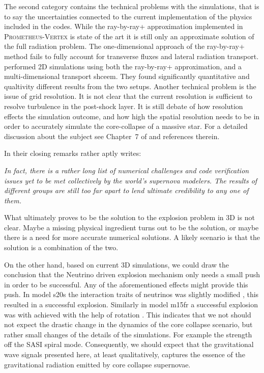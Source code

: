 The second category contains the technical problems with the simulations, 
that is to say the uncertainties connected to the current implementation of the physics included in the codes. 
While the ray-by-ray+ approximation implemented in \textsc{Prometheus-Vertex} \citep{rampp_02} is state of the art it is still only an approximate
solution of the full radiation problem. The one-dimensional approach of the ray-by-ray+ method fails to fully account for
transverse fluxes and lateral radiation transport. \cite{skinner_16} performed 2D simulations using both the ray-by-ray+ approximation,
and a multi-dimensional transport shceem. They found significantly quantitative and qualtivity different results from the two setups.
Another technical problem is the issue of grid resolution. It is not clear that the current resolution is 
sufficient to resolve turbulence in the post-shock layer. It is still debate of how resolution effects the simulation outcome, and
how high the spatial resolution needs to be in order to accurately simulate the core-collapse of a massive star. For a detailed discussion
about the subject see Chapter~7 of \cite{melson_phd} and references therein. 

In their closing remarks \cite{skinner_16} rather aptly writes:
\begin{displayquote}
\textit{In fact, there is a rather long list of numerical
challenges and code verification issues yet to be met
collectively by the world’s supernova modelers. The results
of different groups are still too far apart to lend ultimate
credibility to any one of them.} 
\end{displayquote}
What ultimately proves to be the solution to the explosion problem in 3D is not clear. Maybe a
missing physical ingredient turns out to be the solution, or maybe there is a need for
more accurate numerical solutions. A likely scenario is that the solution is
a combination of the two. 

On the other hand, based on current 3D simulations, we could draw the conclusion that the Neutrino driven explosion 
mechanism only needs a small push in order to be successful. Any of the aforementioned effects might provide this push. 
In model s20s the interaction traits of neutrinos was slightly modified \citep{melson_15b}, this resulted in a successful explosion. 
Similarly in model m15fr a successful explosion was with achieved with the help of rotation \citep{suma_models}. 
This indicates that we not should not expect the drastic change in the dynamics of the core collapse scenario, 
but rather small changes of the details of the simulations. For example the strength off the SASI spiral mode. 
Consequently, we should expect that the gravitational wave signals presented here, at least qualitatively, 
captures the essence of the gravitational radiation emitted by core collapse supernovae. 

